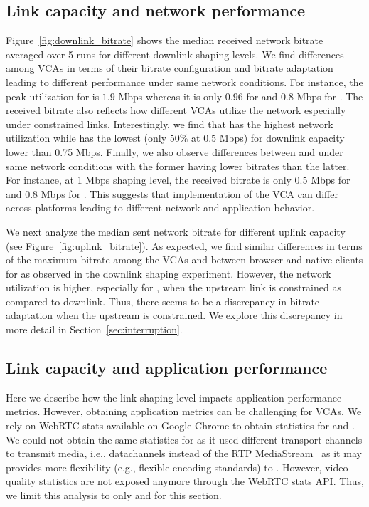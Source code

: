 \subsection{Link capacity and network performance} Figure~\ref{fig:downlink_bitrate} shows the median received network bitrate averaged over 5 runs for different downlink shaping levels. We find differences among VCAs in terms of their bitrate configuration and bitrate adaptation leading to different performance under same network conditions. For instance, the peak utilization for \teamsnative is $1.9$ Mbps whereas it is only $0.96$ for \zoomnative and $0.8$ Mbps for \meet. The received bitrate also reflects how different VCAs utilize the network especially under constrained links. Interestingly, we find that \zoomnative has the highest network utilization while \meet has the lowest (only $50\%$ at 0.5 Mbps) for downlink capacity lower than 0.75 Mbps. Finally, we also observe differences between \teamsbrowser and \teamsnative under same network conditions with the former having lower bitrates than the latter. For instance, at 1 Mbps shaping level, the received bitrate is only 0.5 Mbps for \teamsbrowser and 0.8 Mbps for \teamsnative. This suggests that implementation of the VCA can differ across platforms leading to different network and application behavior. 

We next analyze the median sent network bitrate for different uplink capacity (see Figure~\ref{fig:uplink_bitrate}). As expected, we find similar differences in terms of the maximum bitrate among the VCAs and between browser and native clients for \teams as observed in the downlink shaping experiment. However, the network utilization is higher, especially for \meet, when the upstream link is constrained as compared to downlink. Thus, there seems to be a discrepancy in bitrate adaptation when the upstream is constrained. We explore this discrepancy in more detail in Section~\ref{sec:interruption}. 

\subsection{Link capacity and application performance}
Here we describe how the link shaping level impacts application performance metrics. However, obtaining application metrics can be challenging for VCAs. We rely on WebRTC stats available on Google Chrome to obtain statistics for \teamsbrowser and \meet. We could not obtain the same statistics for \zoombrowser as it used different transport channels to transmit media, i.e., datachannels instead of the RTP MediaStream~\cite{zoom_uses_datachannel, webrtc_stats} as it may provides more flexibility (e.g., flexible encoding standards) to \zoom. However, video quality statistics are not exposed anymore through the WebRTC stats API. %
Thus, we limit this analysis to only \meet and \teamsbrowser for this section. 

